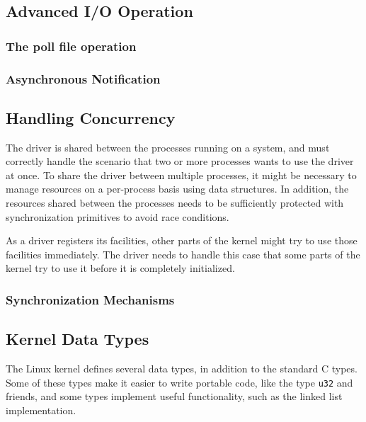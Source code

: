 \subsection{Advanced I/O Operation}
\subsubsection{The poll file operation}\label{sec:the-poll-file-operation}
\subsubsection{Asynchronous Notification}\label{sec:asynchronous-notification}



\subsection{Handling Concurrency}\label{sec:handling-concurrency}
The driver is shared between the processes running on a system, and must correctly handle the scenario that two or more processes wants to use the driver at once. To share the driver between multiple processes, it might be necessary to manage resources on a per-process basis using data structures. In addition, the resources shared between the processes needs to be sufficiently protected with synchronization primitives to avoid race conditions.

As a driver registers its facilities, other parts of the kernel might try to use those facilities immediately. The driver needs to handle this case that some parts of the kernel try to use it before it is completely initialized.

\subsubsection{Synchronization Mechanisms}\label{sec:synchronization-mechanisms}



\subsection{Kernel Data Types}\label{sec:kernel-data-types}
The Linux kernel defines several data types, in addition to the standard C types. Some of these types make it easier to write portable code, like the type \texttt{u32} and friends, and some types implement useful functionality, such as the linked list implementation.

